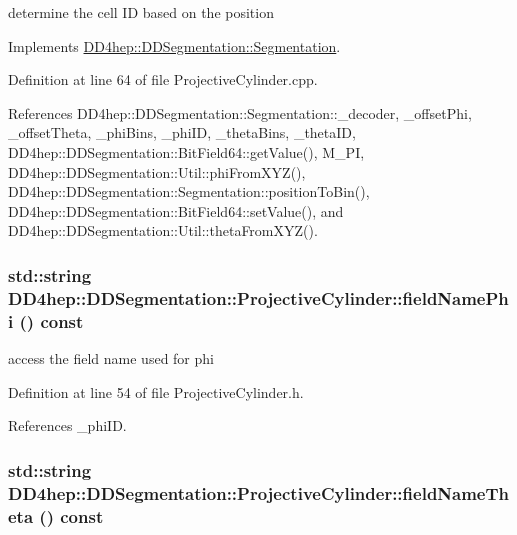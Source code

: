 determine the cell ID based on the position 

Implements \hyperlink{class_d_d4hep_1_1_d_d_segmentation_1_1_segmentation_ad5a60953d96d409850d8192f64f8ce3c}{DD4hep::DDSegmentation::Segmentation}.

Definition at line 64 of file ProjectiveCylinder.cpp.

References DD4hep::DDSegmentation::Segmentation::\_\-decoder, \_\-offsetPhi, \_\-offsetTheta, \_\-phiBins, \_\-phiID, \_\-thetaBins, \_\-thetaID, DD4hep::DDSegmentation::BitField64::getValue(), M\_\-PI, DD4hep::DDSegmentation::Util::phiFromXYZ(), DD4hep::DDSegmentation::Segmentation::positionToBin(), DD4hep::DDSegmentation::BitField64::setValue(), and DD4hep::DDSegmentation::Util::thetaFromXYZ().\hypertarget{class_d_d4hep_1_1_d_d_segmentation_1_1_projective_cylinder_a6a162ab172850ebba3125ea4bd82a0b3}{
\subsubsection[{fieldNamePhi}]{\setlength{\rightskip}{0pt plus 5cm}std::string DD4hep::DDSegmentation::ProjectiveCylinder::fieldNamePhi () const}}
\label{class_d_d4hep_1_1_d_d_segmentation_1_1_projective_cylinder_a6a162ab172850ebba3125ea4bd82a0b3}


access the field name used for phi 

Definition at line 54 of file ProjectiveCylinder.h.

References \_\-phiID.\hypertarget{class_d_d4hep_1_1_d_d_segmentation_1_1_projective_cylinder_a1f671dc0f8458d3124e558bc814aabec}{
\subsubsection[{fieldNameTheta}]{\setlength{\rightskip}{0pt plus 5cm}std::string DD4hep::DDSegmentation::ProjectiveCylinder::fieldNameTheta () const}}
\label{class_d_d4hep_1_1_d_d_segmentation_1_1_projective_cylinder_a1f671dc0f8458d3124e558bc814aabec}



